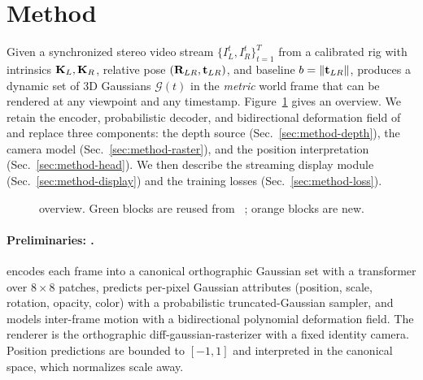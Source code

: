 \section{Method}
\label{sec:method}

Given a synchronized stereo video stream
$\{I_L^t, I_R^t\}_{t=1}^{T}$ from a calibrated rig with intrinsics
$\mathbf{K}_L, \mathbf{K}_R$, relative pose $(\mathbf{R}_{LR}, \mathbf{t}_{LR})$, and baseline
$b = \|\mathbf{t}_{LR}\|$, \StereoSplat produces a dynamic set of 3D Gaussians
$\mathcal{G}(t)$ in the \emph{metric} world frame that can be rendered at
any viewpoint and any timestamp. Figure~\ref{fig:pipeline} gives an
overview. We retain the encoder, probabilistic decoder, and bidirectional
deformation field of \StreamSplat~\cite{wu2026streamsplat} and replace
three components: the depth source (Sec.~\ref{sec:method-depth}), the
camera model (Sec.~\ref{sec:method-raster}), and the position
interpretation (Sec.~\ref{sec:method-head}). We then describe the
streaming display module (Sec.~\ref{sec:method-display}) and the training
losses (Sec.~\ref{sec:method-loss}).

\begin{figure}[t]
\centering
{}
\caption{\StereoSplat overview. Green blocks are reused from
\StreamSplat~\cite{wu2026streamsplat}; orange blocks are new.}
\label{fig:pipeline}
\end{figure}

\paragraph{Preliminaries: \StreamSplat.}
\StreamSplat encodes each frame into a canonical orthographic Gaussian
set with a transformer over $8{\times}8$ patches, predicts per-pixel
Gaussian attributes (position, scale, rotation, opacity, color) with a
probabilistic truncated-Gaussian sampler, and models inter-frame motion
with a bidirectional polynomial deformation field. The renderer is the
orthographic diff-gaussian-rasterizer with a fixed identity camera.
Position predictions are bounded to $[-1,1]$ and interpreted in the
canonical space, which normalizes scale away.

